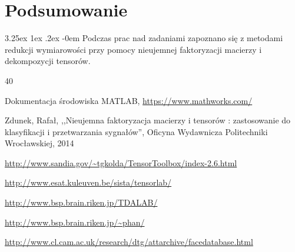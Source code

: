 \documentclass[11pt, a4paper]{article}
\makeatletter
\renewcommand\paragraph{\@startsection{paragraph}{5}{\z@}
  {3.25ex \@plus1ex \@minus.2ex}
  {-0em}
  {\normalfont\normalsize\bfseries}}
\makeatother
\begin{document}
\section{Podsumowanie}
\paragraph{}
Podczas prac nad zadaniami zapoznano się z metodami redukcji wymiarowości przy pomocy nieujemnej faktoryzacji macierzy i dekompozycji tensorów.


\newpage
\begin{thebibliography}{40}

Dokumentacja środowiska MATLAB,
\url{https://www.mathworks.com/}

Zdunek, Rafał, ,,Nieujemna faktoryzacja macierzy i tensorów : zastosowanie do klasyfikacji i przetwarzania sygnałów'', Oficyna Wydawnicza Politechniki Wrocławskiej, 2014

\url{http://www.sandia.gov/~tgkolda/TensorToolbox/index-2.6.html}

\url{http://www.esat.kuleuven.be/sista/tensorlab/}

\url{http://www.bsp.brain.riken.jp/TDALAB/}

\url{http://www.bsp.brain.riken.jp/~phan/}

\url{http://www.cl.cam.ac.uk/research/dtg/attarchive/facedatabase.html}

\end{thebibliography}
\end{document}
